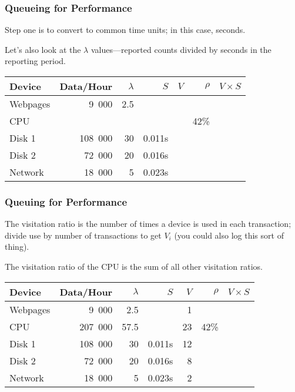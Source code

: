 \begin{frame}
\frametitle{Queueing for Performance}

\begin{changemargin}{1cm}
\large 
Step one is to convert to common time units; in this case, seconds.

Let's also look at the $\lambda$ values---reported counts divided by seconds in the reporting period.
\end{changemargin}

\begin{center}
\begin{tabular}{l|r|r|r|r|r|r} 
	\textbf{Device} & \textbf{Data/Hour} & \textbf{$\lambda$} & \textbf{$S$} & \textbf{$V$} & \textbf{$\rho$} & \textbf{$V \times S$} \\ \hline
	Webpages & 9~000 & 2.5 & & & & \\ \hline
	CPU & & & & & 42\% & \\ \hline
	Disk 1 & 108~000 & 30 & 0.011s  & & &\\ \hline
	Disk 2 & 72~000 & 20 & 0.016s & & &\\ \hline
	Network & 18~000 & 5 & 0.023s & & &
\end{tabular}
\end{center}

\end{frame}



\begin{frame}
\frametitle{Queuing for Performance}

\begin{changemargin}{1cm}
\large 
The visitation ratio is the number of times a device is used in each transaction; divide use by number of transactions to get $V_{i}$ (you could also log this sort of thing). 

The visitation ratio of the CPU is the sum of all other visitation ratios.
\end{changemargin}

\begin{center}
\begin{tabular}{l|r|r|r|r|r|r} 
	\textbf{Device} & \textbf{Data/Hour} & \textbf{$\lambda$} & \textbf{$S$} & \textbf{$V$} & \textbf{$\rho$} & \textbf{$V \times S$} \\ \hline
	Webpages & 9~000 & 2.5 & & 1 & & \\ \hline
	CPU & 207~000 & 57.5 &  & 23 & 42\% & \\ \hline
	Disk 1 & 108~000 & 30 & 0.011s  & 12& &\\ \hline
	Disk 2 & 72~000 & 20 & 0.016s & 8 & &\\ \hline
	Network & 18~000 & 5 & 0.023s & 2 & &\\ 
\end{tabular}
\end{center}

\end{frame}




